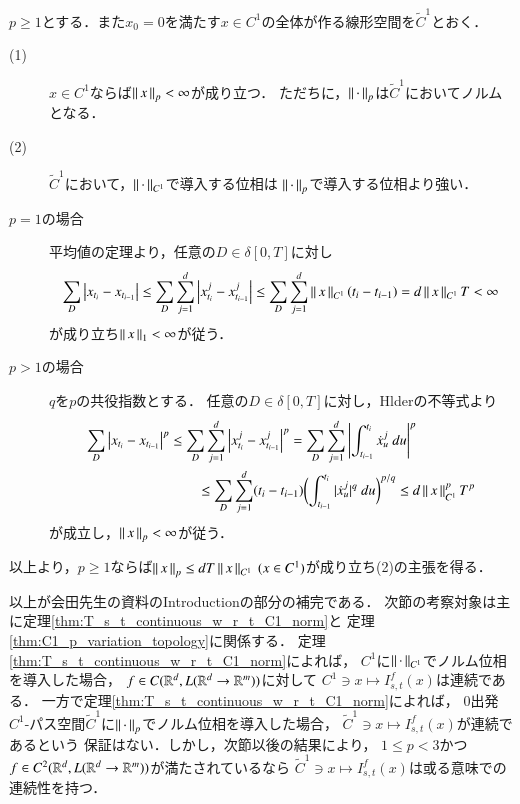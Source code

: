 \begin{screen}
	\begin{thm}\label{thm:C1_p_variation_topology}
		$p \geq 1$とする．また$x_0 = 0$を満たす$x \in C^1$の全体が作る線形空間を$\tilde{C}^1$とおく．
		\begin{description}
			\item[(1)] $x \in C^1$ならば$\left\|\, x\, \right\|_{p} < \infty$が成り立つ．
				ただちに，$\left\|\, \cdot\, \right\|_{p}$は$\tilde{C}^1$においてノルムとなる．
			\item[(2)] $\tilde{C}^1$において，$\left\|\, \cdot\, \right\|_{C^1}$で導入する位相は
				$\left\|\, \cdot\, \right\|_{p}$で導入する位相より強い．
		\end{description}
	\end{thm}
\end{screen}

\begin{prf}\mbox{}
	\begin{description}
		\item[$p = 1$の場合]
			平均値の定理より，任意の$D \in \delta[0,T]$に対し
			\begin{align}
				\sum_D \left| x_{t_i} - x_{t_{i-1}} \right|
				\leq \sum_D \sum_{j=1}^d \left| x^j_{t_i} - x^j_{t_{i-1}} \right|
				\leq \sum_D \sum_{j=1}^d \left\|\, x\, \right\|_{C^1}(t_i - t_{i-1})
				= d\left\|\, x\, \right\|_{C^1}T < \infty
			\end{align}
			が成り立ち$\left\|\, x\, \right\|_{1} < \infty$が従う．
		
		\item[$p > 1$の場合] $q$を$p$の共役指数とする．
			任意の$D \in \delta[0,T]$に対し，Hlderの不等式より
			\begin{align}
				\sum_D \left| x_{t_i} - x_{t_{i-1}} \right|^p
				&\leq \sum_D \sum_{j=1}^d \left| x^j_{t_i} - x^j_{t_{i-1}} \right|^p
				= \sum_D \sum_{j=1}^d \left| \int_{t_{i-1}}^{t_i} \dot{x}^j_{u}\ du \right|^p \\
				&\qquad \leq \sum_D \sum_{j=1}^d (t_i - t_{i-1})
					\biggl( \int_{t_{i-1}}^{t_i} | \dot{x}^j_{u} |^q\ du \biggr)^{p/q}
				\leq d\left\|\, x\, \right\|_{C^1}^p T^p
			\end{align}
			が成立し，$\left\|\, x\, \right\|_{p} < \infty$が従う．
	\end{description}
	以上より，$p \geq 1$ならば$\left\|\, x\, \right\|_{p} \leq dT\left\|\, x\, \right\|_{C^1}\ (x \in C^1)$が成り立ち(2)の主張を得る．
	\QED
\end{prf}

	以上が会田先生の資料のIntroductionの部分の補完である．
	次節の考察対象は主に定理\ref{thm:T_s_t_continuous_w_r_t_C1_norm}と
	定理\ref{thm:C1_p_variation_topology}に関係する．
	定理\ref{thm:T_s_t_continuous_w_r_t_C1_norm}によれば，
	$C^1$に$\left\|\, \cdot\, \right\|_{C^1}$でノルム位相を導入した場合，
	$f \in C(\mathbb{R}^d,L(\mathbb{R}^d \rightarrow \mathbb{R}^m))$に対して
	$C^1 \ni x \longmapsto I^f_{s,t}(x)$は連続である．
	一方で定理\ref{thm:T_s_t_continuous_w_r_t_C1_norm}によれば，
	0出発$C^1$-パス空間$\tilde{C}^1$に$\left\|\, \cdot\, \right\|_{p}$でノルム位相を導入した場合，
	$\tilde{C}^1 \ni x \longmapsto I^f_{s,t}(x)$が連続であるという
	保証はない．しかし，次節以後の結果により，
	$1 \leq p < 3$かつ$f \in C^2(\mathbb{R}^d,L(\mathbb{R}^d \rightarrow \mathbb{R}^m))$が満たされているなら
	$\tilde{C}^1 \ni x \longmapsto I^f_{s,t}(x)$は或る意味での連続性を持つ．
